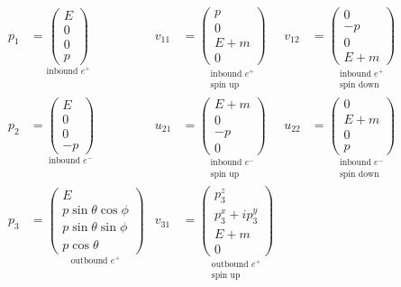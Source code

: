 \documentclass[12pt]{article}
\begin{document}
\begin{align*}
p_1&=\underset{\text{inbound $e^+$}}
{\begin{pmatrix}E\\0\\0\\p\end{pmatrix}}
& v_{11}&=\underset{\substack{\text{inbound $e^+$}\\\text{spin up}}}
{\begin{pmatrix}p\\0\\E+m\\0\end{pmatrix}}
& v_{12}&=\underset{\substack{\text{inbound $e^+$}\\\text{spin down}}}
{\begin{pmatrix}0\\-p\\0\\E+m\end{pmatrix}}
\\[1ex]
p_2&=\underset{\text{inbound $e^-$}}
{\begin{pmatrix}E\\0\\0\\-p\end{pmatrix}}
& u_{21}&=\underset{\substack{\text{inbound $e^-$}\\\text{spin up}}}
{\begin{pmatrix}E+m\\0\\-p\\0\end{pmatrix}}
& u_{22}&=\underset{\substack{\text{inbound $e^-$}\\\text{spin down}}}
{\begin{pmatrix}0\\E+m\\0\\p\end{pmatrix}}
\\[1ex]
p_3&=\underset{\text{outbound $e^+$}}
{\begin{pmatrix}E\\p\sin\theta\cos\phi\\p\sin\theta\sin\phi\\p\cos\theta\end{pmatrix}}
& v_{31}&=\underset{\substack{\text{outbound $e^+$}\\\text{spin up}}}
{\begin{pmatrix}p_3^z\\p_3^x+ip_3^y\\E+m\\0\end{pmatrix}}

\end{align*}
\end{document}
